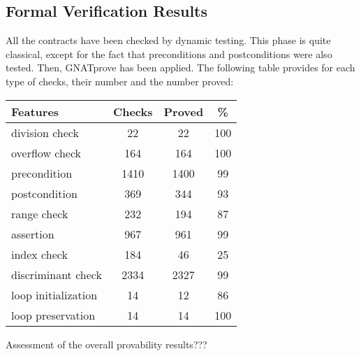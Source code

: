 \documentclass[10pt,a4paper,twocolumn]{article}
\newcommand{\gnatprove}{GNATprove\xspace}
\begin{document}
\subsection{Formal Verification Results}

All the contracts have been checked by dynamic testing. This phase is quite
classical, except for the fact that preconditions and postconditions were also
tested. Then, \gnatprove has been applied. The following table provides for each
type of checks, their number and the number proved:

\vspace{5mm}

\begin{tabular}{|l|c|c|c|}
\hline
Features            & Checks & Proved & \%  \\
\hline
division check      & 22     & 22     & 100 \\
\hline
overflow check      & 164    & 164    & 100 \\
\hline
precondition        & 1410   & 1400   & 99  \\
\hline
postcondition       & 369    & 344    & 93  \\
\hline
range check         & 232    & 194    & 87  \\
\hline
assertion           & 967    & 961    & 99  \\
\hline
index check         & 184    & 46     & 25  \\
\hline
discriminant check  & 2334   & 2327   & 99  \\
\hline
loop initialization & 14     & 12     & 86  \\
\hline
loop  preservation  & 14     & 14     & 100 \\
\hline
\end{tabular}

\vspace{5mm}

Assessment of the overall provability results???
\end{document}

